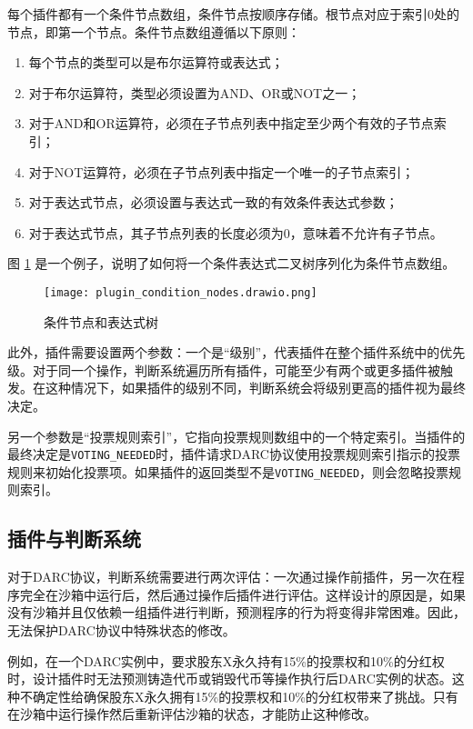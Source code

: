 \documentclass[main.tex]{subfiles}
\begin{document}
每个插件都有一个条件节点数组，条件节点按顺序存储。根节点对应于索引0处的节点，即第一个节点。条件节点数组遵循以下原则：

\begin{enumerate}
    \item 每个节点的类型可以是布尔运算符或表达式；
    \item 对于布尔运算符，类型必须设置为AND、OR或NOT之一；
    \item 对于AND和OR运算符，必须在子节点列表中指定至少两个有效的子节点索引；
    \item 对于NOT运算符，必须在子节点列表中指定一个唯一的子节点索引；
    \item 对于表达式节点，必须设置与表达式一致的有效条件表达式参数；
    \item 对于表达式节点，其子节点列表的长度必须为0，意味着不允许有子节点。
\end{enumerate}

图 \ref{fig:condition-nodes} 是一个例子，说明了如何将一个条件表达式二叉树序列化为条件节点数组。

\begin{figure}
\centering
\texttt{[image: plugin\_condition\_nodes.drawio.png]}
\caption{\label{fig:condition-nodes}条件节点和表达式树}
\end{figure}

此外，插件需要设置两个参数：一个是``级别''，代表插件在整个插件系统中的优先级。对于同一个操作，判断系统遍历所有插件，可能至少有两个或更多插件被触发。在这种情况下，如果插件的级别不同，判断系统会将级别更高的插件视为最终决定。

另一个参数是``投票规则索引''，它指向投票规则数组中的一个特定索引。当插件的最终决定是\texttt{VOTING\_NEEDED}时，插件请求DARC协议使用投票规则索引指示的投票规则来初始化投票项。如果插件的返回类型不是\texttt{VOTING\_NEEDED}，则会忽略投票规则索引。



\subsection{插件与判断系统}

对于DARC协议，判断系统需要进行两次评估：一次通过操作前插件，另一次在程序完全在沙箱中运行后，然后通过操作后插件进行评估。这样设计的原因是，如果没有沙箱并且仅依赖一组插件进行判断，预测程序的行为将变得非常困难。因此，无法保护DARC协议中特殊状态的修改。

例如，在一个DARC实例中，要求股东X永久持有15\%的投票权和10\%的分红权时，设计插件时无法预测铸造代币或销毁代币等操作执行后DARC实例的状态。这种不确定性给确保股东X永久拥有15\%的投票权和10\%的分红权带来了挑战。只有在沙箱中运行操作然后重新评估沙箱的状态，才能防止这种修改。
\end{document}
